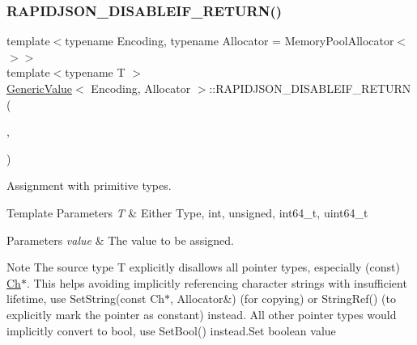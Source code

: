 \subsubsection{\texorpdfstring{R\+A\+P\+I\+D\+J\+S\+O\+N\+\_\+\+D\+I\+S\+A\+B\+L\+E\+I\+F\+\_\+\+R\+E\+T\+U\+R\+N()}{RAPIDJSON\_DISABLEIF\_RETURN()}\hspace{0.1cm}{\footnotesize\ttfamily [1/2]}}
{\footnotesize\ttfamily template$<$typename Encoding, typename Allocator = Memory\+Pool\+Allocator$<$$>$$>$ \\
template$<$typename T $>$ \\
\hyperlink{classGenericValue}{Generic\+Value}$<$ Encoding, Allocator $>$\+::R\+A\+P\+I\+D\+J\+S\+O\+N\+\_\+\+D\+I\+S\+A\+B\+L\+E\+I\+F\+\_\+\+R\+E\+T\+U\+RN (\begin{DoxyParamCaption}\item[{(internal\+::\+Is\+Pointer$<$ T $>$)}]{,  }\item[{(\hyperlink{classGenericValue}{Generic\+Value}$<$ Encoding, Allocator $>$ \&)}]{ }\end{DoxyParamCaption})}



Assignment with primitive types. 


\begin{DoxyTemplParams}{Template Parameters}
{\em T} & Either Type, {\ttfamily int}, {\ttfamily unsigned}, {\ttfamily int64\+\_\+t}, {\ttfamily uint64\+\_\+t} \\
\hline
\end{DoxyTemplParams}

\begin{DoxyParams}{Parameters}
{\em value} & The value to be assigned.\\
\hline
\end{DoxyParams}
\begin{DoxyNote}{Note}
The source type {\ttfamily T} explicitly disallows all pointer types, especially ({\ttfamily const}) \hyperlink{classGenericValue_ade0e0ce64ccd5d852da57a35e720bafb}{Ch}$\ast$. This helps avoiding implicitly referencing character strings with insufficient lifetime, use Set\+String(const Ch$\ast$, Allocator\&) (for copying) or String\+Ref() (to explicitly mark the pointer as constant) instead. All other pointer types would implicitly convert to {\ttfamily bool}, use Set\+Bool() instead.\+Set boolean value 
\end{DoxyNote}
\mbox{\label{classGenericValue_a4a4418a93777942e1fb7ea71f8aaf680}} 

